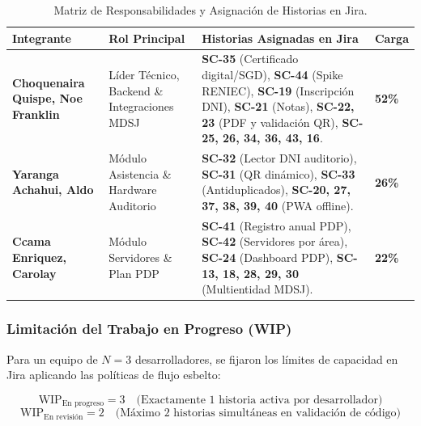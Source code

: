 \begin{table}[H]
\centering
\small
\caption{Matriz de Responsabilidades y Asignación de Historias en Jira.}
\label{tab:responsables}
\begin{tabularx}{\textwidth}{P{3.5cm} P{3.0cm} Y P{1.5cm}}
\toprule
\textbf{Integrante} & \textbf{Rol Principal} & \textbf{Historias Asignadas en Jira} & \textbf{Carga} \\
\midrule
\textbf{Choquenaira Quispe, Noe Franklin} & Líder Técnico, Backend \& Integraciones MDSJ & 
\textbf{SC-35} (Certificado digital/SGD), \textbf{SC-44} (Spike RENIEC), \textbf{SC-19} (Inscripción DNI), \textbf{SC-21} (Notas), \textbf{SC-22, 23} (PDF y validación QR), \textbf{SC-25, 26, 34, 36, 43, 16}. & \textbf{52\%} \\
\addlinespace[0.1cm]
\textbf{Yaranga Achahui, Aldo} & Módulo Asistencia \& Hardware Auditorio & 
\textbf{SC-32} (Lector DNI auditorio), \textbf{SC-31} (QR dinámico), \textbf{SC-33} (Antiduplicados), \textbf{SC-20, 27, 37, 38, 39, 40} (PWA offline). & \textbf{26\%} \\
\addlinespace[0.1cm]
\textbf{Ccama Enriquez, Carolay} & Módulo Servidores \& Plan PDP & 
\textbf{SC-41} (Registro anual PDP), \textbf{SC-42} (Servidores por área), \textbf{SC-24} (Dashboard PDP), \textbf{SC-13, 18, 28, 29, 30} (Multientidad MDSJ). & \textbf{22\%} \\
\bottomrule
\end{tabularx}
\end{table}

\subsubsection{Limitación del Trabajo en Progreso (WIP)}
Para un equipo de $N = 3$ desarrolladores, se fijaron los límites de capacidad en Jira aplicando las políticas de flujo esbelto:

\begin{equation}
    \text{WIP}_{\text{En progreso}} = 3 \quad \text{(Exactamente 1 historia activa por desarrollador)}
\end{equation}
\begin{equation}
    \text{WIP}_{\text{En revisión}} = 2 \quad \text{(Máximo 2 historias simultáneas en validación de código)}
\end{equation}

